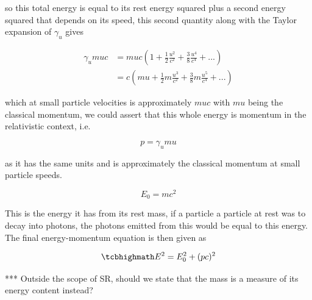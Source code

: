 so this total energy is equal to its rest energy squared plus a second energy squared that depends on its speed, this second quantity along with the Taylor expansion of $\gamma_{u}$ gives

\begin{equation}
	\begin{aligned}
		\gamma_{u} {m}{u}{c} & = {m}{u}{c} \left(1 + \frac{1}{2}\frac{u^2}{{c}^2} + \frac{3}{8}\frac{u^4}{c^4} + ...
		\right)                                                                                                       \\
		                     & ={c}\left( {m}{u} + \frac{1}{2}m \frac{u^3}{{c}^2} + \frac{3}{8}m\frac{u^5}{c^4} + ...
		\right)
	\end{aligned}
\end{equation}

which at small particle velocities is approximately ${m}{u}{c}$ with ${m}{u}$ being the classical momentum, we could assert that this whole energy is momentum in the relativistic context, i.e.

\begin{equation}
	p = \gamma_{u} {m}{u}
\end{equation}

as it has the same units and is approximately the classical momentum at small particle speeds.

\begin{equation}
	E_0 = {m}{c}^2
\end{equation}

This is the energy it has from its rest mass, if a particle a particle at rest was to decay into photons, the photons emitted from this would be equal to this energy.
The final energy-momentum equation is then given as

\begin{equation}
	\mhl{
		E^2 = E_0^2 + (pc)^2
	}
\end{equation}

*** Outside the scope of SR, should we state that the mass is a measure of its energy content instead?



